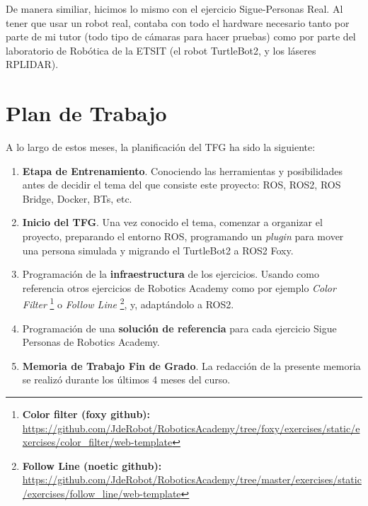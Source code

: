 De manera similiar, hicimos lo mismo con el ejercicio Sigue-Personas Real. Al tener que usar un robot real, contaba con todo el hardware necesario tanto por parte de mi tutor (todo tipo de cámaras para hacer pruebas) como por parte del laboratorio de Robótica de la ETSIT (el robot TurtleBot2, y los láseres RPLIDAR).


\section{Plan de Trabajo}
\label{sec:plan_trabajo}
A lo largo de estos meses, la planificación del TFG ha sido la siguiente:

\begin{enumerate}
	\item \textbf{Etapa de Entrenamiento}. Conociendo las herramientas y posibilidades antes de decidir el tema del que consiste este proyecto: ROS, ROS2, ROS Bridge, Docker, BTs, etc.
	\item \textbf{Inicio del TFG}. Una vez conocido el tema, comenzar a organizar el proyecto, preparando el entorno ROS, programando un \textit{plugin} para mover una persona simulada y migrando el TurtleBot2 a ROS2 Foxy.
	\item Programación de la \textbf{infraestructura} de los ejercicios. Usando como referencia otros ejercicios de Robotics Academy como por ejemplo \textit{Color Filter} \footnote{\textbf{Color filter (foxy github):} \url{https://github.com/JdeRobot/RoboticsAcademy/tree/foxy/exercises/static/exercises/color_filter/web-template}} o \textit{Follow Line} \footnote{\textbf{Follow Line (noetic github):} \url{https://github.com/JdeRobot/RoboticsAcademy/tree/master/exercises/static/exercises/follow_line/web-template}}, y, adaptándolo a ROS2.
	\item Programación de una \textbf{solución de referencia} para cada ejercicio Sigue Personas de Robotics Academy.
	\item \textbf{Memoria de Trabajo Fin de Grado}. La redacción de la presente memoria se realizó durante los últimos 4 meses del curso. 
\end{enumerate}


